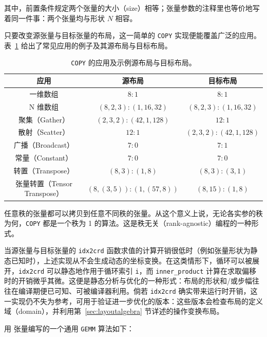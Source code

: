 \noindent 其中，前置条件规定两个张量的大小（size）相等；张量参数的注释里也等价地写着同一件事：两个张量均与形状 $N$ 相容。

只要改变源张量与目标张量的布局，这一简单的 \texttt{COPY} 实现便能覆盖广泛的应用。表~\ref{tab:copy} 给出了常见应用的例子及其源布局与目标布局。

\begin{table}[ht]
\centering
\begin{tabular}{|c|c|c|}
\textbf{应用} & \textbf{源布局} & \textbf{目标布局} \\ \hline\hline
一维数组 & $8:1$ & $8:1$ \\ \hline
N 维数组 & $(8,2,3):(1,16,32)$ & $(8,2,3):(1,16,32)$ \\ \hline
聚集（Gather） & $(2,3,2):(42,1,128)$ & $12:1$\\ \hline
散射（Scatter） & $12:1$ & $(2,3,2):(42,1,128)$\\ \hline
广播（Broadcast） & $7:0$ & $7:1$\\ \hline
常量（Constant） & $7:0$ & $7:0$\\ \hline
转置（Transpose） & $(8,3):(1,8)$ & $(8,3):(3,1)$\\ \hline
张量转置（Tensor Transpose） & $(8,(3,5)):(1,(57,8))$ & $(8,15):(1,8)$\\ \hline
\end{tabular}
\caption{{\tt COPY} 的应用及示例源布局与目标布局。}
\label{tab:copy}
\end{table}

任意秩的张量都可以拷贝到任意不同秩的张量。从这个意义上说，无论各实参的秩为何，{\tt COPY} 都是一个秩为 1 的算法。这是秩无关（rank-agnostic）编程的一种形式。

当源张量与目标张量的 \texttt{idx2crd} 函数求值的计算开销很低时（例如张量形状为静态已知时），上述实现从不会生成动态的坐标变换。在这类情形下，循环可以被展开，\texttt{idx2crd} 可以静态地作用于循环索引 \texttt{i}，而 \texttt{inner\_product} 计算在求取偏移时的开销微乎其微。这便是静态分析与优化的一种形式：布局的形状和/或步幅往往在编译期便已可知、可被编译器利用。倘若 \texttt{idx2crd} 确实带来运行时开销，这一实现仍不失为参考，可用于验证进一步优化的版本：这些版本会检查布局的定义域（domain），并利用第~\ref{sec:layoutalgebra} 节详述的操作变换布局。

\label{sec:gemm}

用 \CuTe 张量编写的一个通用 {\tt GEMM} 算法如下：

